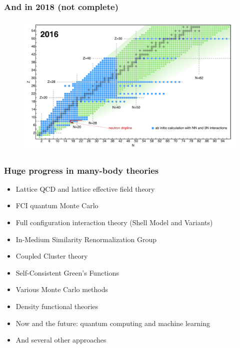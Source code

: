 \documentclass[compress]{beamer}
\begin{document}
\frame
{
  \frametitle{And in 2018 (not complete) }
      \begin{figure}[htp]
        \centering	
        	\includegraphics[width=1.1\textwidth]{Figures/abinitio2016.png}
      \end{figure}
}

\frame
{
  \frametitle{Huge progress in many-body theories }
\begin{itemize}
\item Lattice QCD and lattice effective field theory
\item FCI quantum Monte Carlo
\item Full configuration interaction theory (Shell Model and Variants)
\item In-Medium Similarity Renormalization Group
\item Coupled Cluster theory
\item Self-Consistent Green's Functions
\item Various Monte Carlo methods
\item Density functional theories
\item Now and the future: quantum computing and machine learning
\item And several other approaches
\end{itemize}
}
\end{document}
